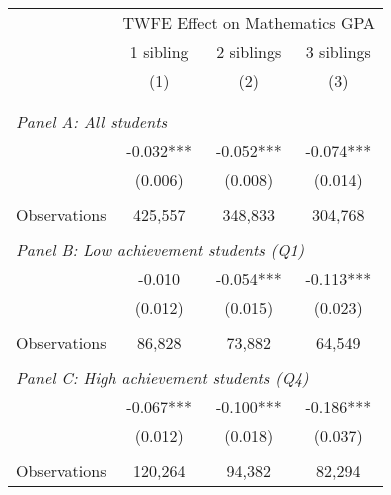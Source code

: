 \makeatletter
{}
{
\makeatother
\begin{tabular}{lccc}
\toprule
\cmidrule(lr){2-4}
& \multicolumn{3}{c}{TWFE Effect on Mathematics GPA} \\
\cmidrule(lr){2-4}
& 1 sibling & 2 siblings & 3 siblings  \\
\cmidrule(lr){2-2} \cmidrule(lr){3-3} \cmidrule(lr){4-4}
& (1) & (2) & (3)\\
\bottomrule
&  &  &  \\
&  &  &   \\
\multicolumn{4}{l}{\textit{Panel A: All students}} \\
\hspace{3mm}        &      -0.032***&      -0.052***&      -0.074***\\
                    &     (0.006)   &     (0.008)   &     (0.014)   \\
                    &               &               &               \\
\hspace{3mm}Observations&     425,557   &     348,833   &     304,768   \\
 
&  &  &   \\
\multicolumn{4}{l}{\textit{Panel B: Low achievement students (Q1)}} \\
\hspace{3mm}        &      -0.010   &      -0.054***&      -0.113***\\
                    &     (0.012)   &     (0.015)   &     (0.023)   \\
                    &               &               &               \\
\hspace{3mm}Observations&      86,828   &      73,882   &      64,549   \\
 
&  &  &   \\
\multicolumn{4}{l}{\textit{Panel C: High achievement students (Q4)}} \\
\hspace{3mm}        &      -0.067***&      -0.100***&      -0.186***\\
                    &     (0.012)   &     (0.018)   &     (0.037)   \\
                    &               &               &               \\
\hspace{3mm}Observations&     120,264   &      94,382   &      82,294   \\
 

\end{tabular}}
